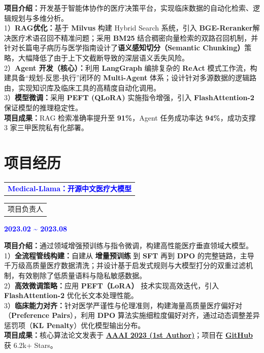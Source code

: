 \documentclass[10.5pt, a4paper]{ctexart}
\begin{document}
\par\noindent
\textbf{项目介绍：}开发基于智能体协作的医疗决策平台，实现临床数据的自动化检索、逻辑规划与多维分析。 \\
1）\textbf{RAG优化：}基于 \textbf{Milvus} 构建 Hybrid Search 系统，引入 \textbf{BGE-Reranker}解决医疗术语召回不精准问题；采用 \textbf{BM25} 结合稠密向量检索的双路召回机制，并针对长篇电子病历与医学指南设计了\textbf{语义感知切分（Semantic Chunking）}策略，大幅降低了由于上下文截断导致的深层语义丢失风险。 \\
2）\textbf{Agent 开发（核心）：}利用 \textbf{LangGraph} 编排复杂的 \textbf{ReAct} 模式工作流，构建具备“规划-反思-执行”闭环的 \textbf{Multi-Agent} 体系；设计针对多源数据的逻辑路由，实现知识库及临床工具的高精度自动化调用。 \\
3）\textbf{模型微调：}采用 \textbf{PEFT (QLoRA)} 实施指令增强，引入 \textbf{FlashAttention-2} 保证模型的推理稳定性。 \\
\textbf{项目成果：}RAG 检索准确率提升至 \textbf{91\%}，Agent 任务成功率达 \textbf{94\%}，成功支撑 3 家三甲医院私有化部署。

\section*{项目经历}
\vspace{-0.5em}

\noindent
\begin{tabular}{@{}p{8cm}@{}} 
    \textcolor{blue}{\textbf{Medical-Llama：开源中文医疗大模型}} 
\end{tabular}
\begin{tabular}{@{}p{6cm}@{}} 
    项目负责人 
\end{tabular}
\hfill\textcolor{blue}{\textbf{2023.02 \textasciitilde{} 2023.08}}

\par\noindent
\textbf{项目介绍：}通过领域增强预训练与指令微调，构建高性能医疗垂直领域大模型。\\
1）\textbf{全流程管线构建：}自建从 \textbf{增量预训练} 到 \textbf{SFT} 再到 \textbf{DPO} 的完整链路，主导千万级高质量医疗数据清洗；并设计基于启发式规则与大模型打分的双重过滤机制，有效剔除了低质量语料与隐私敏感数据。 \\
2）\textbf{高效微调策略：}应用 \textbf{PEFT（LoRA）} 技术实现高效迭代，引入 \textbf{FlashAttention-2} 优化长文本处理性能。 \\
3）\textbf{临床能力对齐：}针对医学严谨性与伦理准则，构建海量高质量医疗偏好对（\textbf{Preference Pairs}），利用 \textbf{DPO} 算法实施细粒度偏好对齐，通过动态调整差异惩罚项（\textbf{KL Penalty}）优化模型输出分布。\\
\textbf{项目成果：}核心算法论文发表于 \href{https://papercopilot.com/paper-list/aaai-paper-list/aaai-2023-paper-list/}{\textbf{AAAI 2023 (1st Author)}}；项目在 \href{https://github.com/your-username/medical-llama}{\textbf{GitHub}} 获 6.2k+ Stars。
\end{document}
